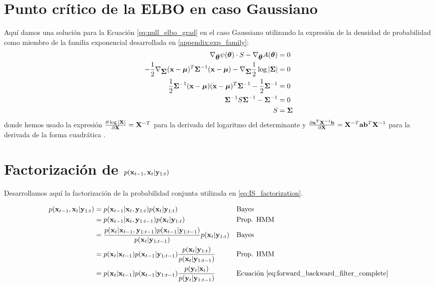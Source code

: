 \section{Punto crítico de la ELBO en caso Gaussiano}\label{appendix:null_grad_elbo}

Aquí damos una solución para la Ecuación \ref{eq:null_elbo_grad} en el caso Gaussiano utilizando la expresión de la densidad de probabilidad como miembro de la familia exponencial desarrollada en \ref{appendix:exp_family}:
\begin{align*}
    \nabla_{\mbox{\boldmath$ \theta $}} \psi(\mbox{\boldmath$ \theta $}) \cdot S - \nabla_{\mbox{\boldmath$ \theta $}} A(\mbox{\boldmath$ \theta $}) &= 0 \\
    -\frac{1}{2} \nabla_{\mbox{\boldmath$ \Sigma $}}  (\mathbf{x}- \mbox{\boldmath$ \mu $})^T \mbox{\boldmath$ \Sigma $}^{-1}(\mathbf{x}-\mbox{\boldmath$ \mu $}) - \nabla_{\mbox{\boldmath$ \Sigma $}} \frac{1}{2} \log |\mbox{\boldmath$ \Sigma $}| &= 0 \\
    \frac{1}{2} \mbox{\boldmath$ \Sigma $}^{-1} (\mathbf{x}- \mbox{\boldmath$ \mu $})(\mathbf{x}-\mbox{\boldmath$ \mu $})^T \mbox{\boldmath$ \Sigma $}^{-1} - \frac{1}{2} \mbox{\boldmath$ \Sigma $}^{-1} &= 0 \\
    \mbox{\boldmath$ \Sigma $}^{-1} S \mbox{\boldmath$ \Sigma $}^{-1} - \mbox{\boldmath$ \Sigma $}^{-1} &= 0 \\
    S &= \mbox{\boldmath$ \Sigma $} 
\end{align*}
donde hemos usado la expresión $\frac{\partial \log|\mathbf{X}|}{\partial \mathbf{X}} = \mathbf{X}^{-T}$ para la derivada del logaritmo del determinante y $\frac{\partial \mathbf{a}^T \mathbf{X}^{-1} \mathbf{b} }{\partial \mathbf{X}} = \mathbf{X}^{-T} \mathbf{a} \mathbf{b}^T \mathbf{X}^{-1}$ para la derivada de la forma cuadrática \cite{Petersen2012}.

\section{Factorización de $p(\mathbf{x}_{t-1}, \mathbf{x}_t| \mathbf{y}_{1:t})$} \label{appendix:IS_factorization}

Desarrollamos aquí la factorización de la probabilidad conjunta utilizada en \ref{eq:IS_factorization}.

\begin{align}
    p(\mathbf{x}_{t-1}, \mathbf{x}_t| \mathbf{y}_{1:t}) &= p(\mathbf{x}_{t-1} | \mathbf{x}_t, \mathbf{y}_{1:t}) p(\mathbf{x}_t| \mathbf{y}_{1:t}) && \text{Bayes} \\
    &= p(\mathbf{x}_{t-1} | \mathbf{x}_t, \mathbf{y}_{1:t-1}) p(\mathbf{x}_t| \mathbf{y}_{1:t}) && \text{Prop. HMM} \\
    &= \frac{p(\mathbf{x}_t| \mathbf{x}_{t-1}, \mathbf{y}_{1:t-1})p(\mathbf{x}_{t-1} | \mathbf{y}_{1:t-1})}{p(\mathbf{x}_t |\mathbf{y}_{1:t-1})} p(\mathbf{x}_t| \mathbf{y}_{1:t}) && \text{Bayes} \\
    &= p(\mathbf{x}_t| \mathbf{x}_{t-1})p(\mathbf{x}_{t-1} | \mathbf{y}_{1:t-1})\frac{p(\mathbf{x}_t| \mathbf{y}_{1:t})}{p(\mathbf{x}_t |\mathbf{y}_{1:t-1})} && \text{Prop. HMM} \\
    &= p(\mathbf{x}_t| \mathbf{x}_{t-1})p(\mathbf{x}_{t-1} | \mathbf{y}_{1:t-1})\frac{p(\mathbf{y}_t| \mathbf{x}_t)}{p(\mathbf{y}_t |\mathbf{y}_{1:t-1})} && \text{Ecuación \ref{eq:forward_backward_filter_complete}}
\end{align}

